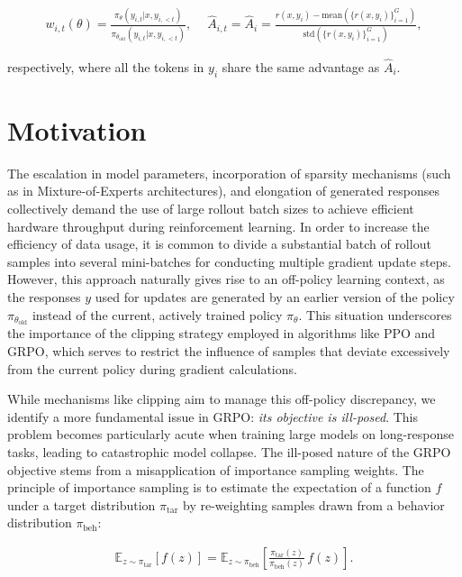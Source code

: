 \begin{align}
    w_{i,t}(\theta)=\frac{ \pi_{\theta} (y_{i,t} | x, y_{i,<t}) }{ \pi_{\theta_\text{old}} (y_{i,t} | x,y_{i,<t})},\quad\ 
    \widehat{A}_{i,t} = \widehat{A}_{i} = \frac{r(x, y_i) - \mathrm{mean} \left( \{ r(x, y_i) \}_{i=1}^G \right) }{ \mathrm{std} \left( \{ r(x, y_i) \}_{i=1}^G \right) },
\end{align}

respectively, where all the tokens in $y_i$ share the same advantage as $\widehat{A}_{i}$.

\section{Motivation}
\label{sec:motivation}

The escalation in model parameters, incorporation of sparsity mechanisms (such as in Mixture-of-Experts architectures), and elongation of generated responses collectively demand the use of large rollout batch sizes to achieve efficient hardware throughput during reinforcement learning. In order to increase the efficiency of data usage, it is common to divide a substantial batch of rollout samples into several mini-batches for conducting multiple gradient update steps. However, this approach naturally gives rise to an off-policy learning context, as the responses $y$ used for updates are generated by an earlier version of the policy $\pi_{\theta_\text{old}}$ instead of the current, actively trained policy $\pi_\theta$. This situation underscores the importance of the clipping strategy employed in algorithms like PPO and GRPO, which serves to restrict the influence of samples that deviate excessively from the current policy during gradient calculations.

While mechanisms like clipping aim to manage this off-policy discrepancy, we identify a more fundamental issue in GRPO: \textit{its objective is ill-posed}. This problem becomes particularly acute when training large models on long-response tasks, leading to catastrophic model collapse. The ill-posed nature of the GRPO objective stems from a misapplication of importance sampling weights. The principle of importance sampling is to estimate the expectation of a function $f$ under a target distribution $\pi_\text{tar}$ by re-weighting samples drawn from a behavior distribution $\pi_\text{beh}$:

\begin{align}
\mathbb{E}_{z \sim \pi_\text{tar}} \left[ f(z) \right] = \mathbb{E}_{z \sim \pi_\text{beh}} \left[ \frac{ \pi_\text{tar} (z) }{ \pi_\text{beh} (z)} \, f(z) \right].
\end{align}

